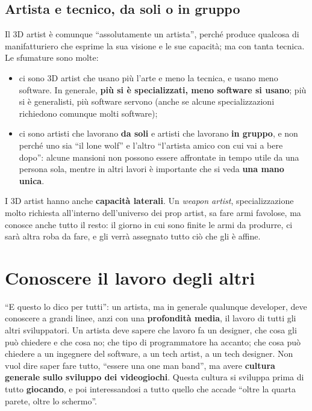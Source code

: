 \subsection{Artista e tecnico, da soli o in gruppo}

Il 3D artist è comunque ``assolutamente un artista'', perché produce qualcosa
di manifatturiero che esprime la sua visione e le sue capacità; ma con tanta
tecnica. Le sfumature sono molte:
\begin{itemize}
  \item ci sono 3D artist che usano più l'arte e meno la tecnica, e usano meno
        software. In generale, \textbf{più si è specializzati, meno software si
        usano}; più si è generalisti, più software servono (anche se alcune
        specializzazioni richiedono comunque molti software);
  \item ci sono artisti che lavorano \textbf{da soli} e artisti che lavorano
        \textbf{in gruppo}, e non perché uno sia ``il lone wolf'' e l'altro
        ``l'artista amico con cui vai a bere dopo'': alcune mansioni non possono
        essere affrontate in tempo utile da una persona sola, mentre in altri
        lavori è importante che si veda \textbf{una mano unica}.
\end{itemize}
I 3D artist hanno anche \textbf{capacità laterali}. Un \emph{weapon artist},
specializzazione molto richiesta all'interno dell'universo dei prop artist, sa
fare armi favolose, ma conosce anche tutto il resto: il giorno in cui sono
finite le armi da produrre, ci sarà altra roba da fare, e gli verrà assegnato
tutto ciò che gli è affine.

\section{Conoscere il lavoro degli altri}
\label{p6:sec:altri}

``E questo lo dico per tutti'': un artista, ma in generale qualunque
developer, deve conoscere a grandi linee, anzi con una \textbf{profondità
media}, il lavoro di tutti gli altri sviluppatori. Un artista deve sapere che
lavoro fa un designer, che cosa gli può chiedere e che cosa no; che tipo di
programmatore ha accanto; che cosa può chiedere a un ingegnere del software, a
un tech artist, a un tech designer. Non vuol dire saper fare tutto, ``essere una
one man band'', ma avere \textbf{cultura generale sullo sviluppo dei
videogiochi}. Questa cultura si sviluppa prima di tutto \textbf{giocando}, e
poi interessandosi a tutto quello che accade ``oltre la quarta parete, oltre lo
schermo''.

